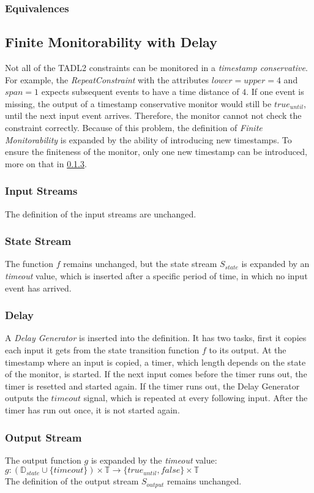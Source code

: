 		\subsubsection{Equivalences}
			
	\subsection{Finite Monitorability with Delay}
		Not all of the TADL2 constraints can be monitored in a \emph{timestamp conservative}. For example, the \emph{RepeatConstraint} with the attributes $lower=upper=4$ and $span=1$ expects subsequent events to have a time distance of $4$. If one event is missing, the output of a timestamp conservative monitor would still be $true_{until}$, until the next input event arrives. Therefore, the monitor cannot not check the constraint correctly. Because of this problem, the definition of \emph{Finite Monitorability} is expanded by the ability of introducing new timestamps. To ensure the finiteness of the monitor, only one new timestamp can be introduced, more on that in \ref{DelayGenerator}.
		\subsubsection{Input Streams}
			The definition of the input streams are unchanged.
		\subsubsection{State Stream}
			The function $f$ remains unchanged, but the state stream $S_{state}$ is expanded by an \emph{timeout} value, which is inserted after a specific period of time, in which no input event has arrived.
		\subsubsection{Delay}
			\label{DelayGenerator}
			A \emph{Delay Generator} is inserted into the definition. It has two tasks, first it copies each input it gets from the state transition function $f$ to its output. At the timestamp where an input is copied, a timer, which length depends on the state of the monitor, is started. If the next input comes before the timer runs out, the timer is resetted and started again. If the timer runs out, the Delay Generator outputs the $timeout$ signal, which is repeated at every following input. After the timer has run out once, it is not started again. 
		\subsubsection{Output Stream}
			The output function $g$ is expanded by the \emph{timeout} value:\\
			$g: (\mathbb{D}_{state}\cup\{timeout\})\times \mathbb{T}\rightarrow \{true_{until}, false\}\times \mathbb{T}$\\
			The definition of the output stream $S_{output}$ remains unchanged.
